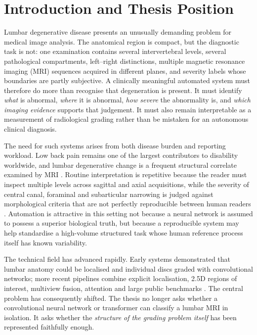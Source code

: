 \section{Introduction and Thesis Position}
\label{sec:intro-position}

Lumbar degenerative disease presents an unusually demanding problem for medical
image analysis. The anatomical region is compact, but the diagnostic task is not:
one examination contains several intervertebral levels, several pathological
compartments, left--right distinctions, multiple magnetic resonance imaging (MRI)
sequences acquired in different planes, and severity labels whose boundaries are
partly subjective. A clinically meaningful automated system must therefore do more
than recognise that degeneration is present. It must identify \emph{what} is
abnormal, \emph{where} it is abnormal, \emph{how severe} the abnormality is, and
\emph{which imaging evidence} supports that judgement. It must also remain
interpretable as a measurement of radiological grading rather than be mistaken for
an autonomous clinical diagnosis.

The need for such systems arises from both disease burden and reporting workload.
Low back pain remains one of the largest contributors to disability worldwide, and
lumbar degenerative change is a frequent structural correlate examined by MRI
\cite{compte2023are,wang2024machine}. Routine interpretation is repetitive because
the reader must inspect multiple levels across sagittal and axial acquisitions,
while the severity of central canal, foraminal and subarticular narrowing is judged
against morphological criteria that are not perfectly reproducible between human
readers \cite{lurie2008reliability,schizas2010qualitative,lee2011a,lee2010a}.
Automation is attractive in this setting not because a neural network is assumed to
possess a superior biological truth, but because a reproducible system may help
standardise a high-volume structured task whose human reference process itself has
known variability.

The technical field has advanced rapidly. Early systems demonstrated that lumbar
anatomy could be localised and individual discs graded with convolutional networks;
more recent pipelines combine explicit localisation, 2.5D regions of interest,
multiview fusion, attention and large public benchmarks
\cite{lu2018deepspine,pan2021automatically,batra2025mscan,richards2026the}. The
central problem has consequently shifted. The thesis no longer asks whether a
convolutional neural network or transformer can classify a lumbar MRI in isolation.
It asks whether the \emph{structure of the grading problem itself} has been
represented faithfully enough.

